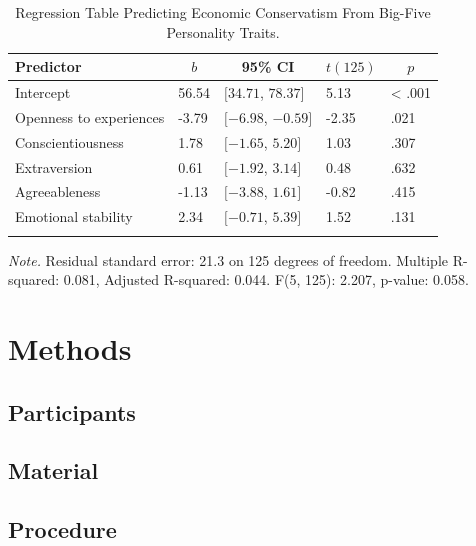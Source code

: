 \documentclass[man]{apa6}
\begin{document}
\begin{table}[tbp]
\begin{center}
\begin{threeparttable}
\caption{\label{tab:linearmodels_conservatism_ocean_tables}Regression Table Predicting Economic Conservatism From Big-Five Personality Traits.}
\begin{tabular}{lllll}
\toprule
Predictor & \multicolumn{1}{c}{$b$} & \multicolumn{1}{c}{95\% CI} & \multicolumn{1}{c}{$t(125)$} & \multicolumn{1}{c}{$p$}\\
\midrule
Intercept & 56.54 & $[34.71$, $78.37]$ & 5.13 & < .001\\
Openness to experiences & -3.79 & $[-6.98$, $-0.59]$ & -2.35 & .021\\
Conscientiousness & 1.78 & $[-1.65$, $5.20]$ & 1.03 & .307\\
Extraversion & 0.61 & $[-1.92$, $3.14]$ & 0.48 & .632\\
Agreeableness & -1.13 & $[-3.88$, $1.61]$ & -0.82 & .415\\
Emotional stability & 2.34 & $[-0.71$, $5.39]$ & 1.52 & .131\\
\bottomrule
\addlinespace
\end{tabular}
\begin{tablenotes}[para]
\normalsize{\textit{Note.} Residual standard error: 21.3 on 125 degrees of freedom. Multiple R-squared: 0.081, Adjusted R-squared: 0.044. F(5, 125): 2.207, p-value: 0.058.}
\end{tablenotes}
\end{threeparttable}
\end{center}
\end{table}

\section{Methods}\label{methods}

\subsection{Participants}\label{participants}

\subsection{Material}\label{material}

\subsection{Procedure}\label{procedure}
\end{document}
